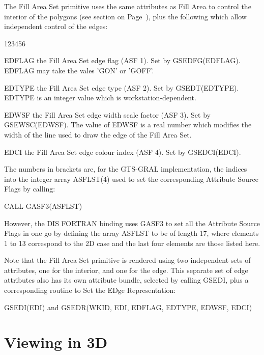 The Fill Area Set primitive uses the same attributes as Fill Area to
control the interior of the polygons (see section on Page~\pageref{sec:attlst}),
plus the following which allow independent control of the edges:
\begin{DLtt}{123456}
\item[EDFLAG]
the Fill Area Set edge flag (ASF 1). Set by GSEDFG(EDFLAG).
EDFLAG may take the vales 'GON' or 'GOFF'.
\item[EDTYPE]
the Fill Area Set edge type (ASF 2). Set by GSEDT(EDTYPE).
EDTYPE is an integer value which is workstation-dependent.
\item[EDWSF]
the Fill Area Set edge width scale factor (ASF 3). Set by GSEWSC(EDWSF).
The value of EDWSF is a real number which modifies the width of the line
used to draw the edge of the Fill Area Set.
\item[EDCI]
the Fill Area Set edge colour index (ASF 4). Set by GSEDCI(EDCI).
\end{DLtt}
The numbers in brackets are, for the GTS-GRAL implementation,
the indices into the integer array ASFLST(4)
used to set the corresponding Attribute Source Flags by calling:
\begin{XMP}
CALL GASF3(ASFLST)
\end{XMP}
However, the DIS FORTRAN binding uses GASF3 to set all the
Attribute Source Flags in one go by defining the array ASFLST to be of
length 17, where elements 1 to 13 correspond to the 2D case and the last
four elements are those listed here.
 
Note that the Fill Area Set
primitive is rendered using two independent sets of attributes,
one for the interior, and one for the edge. This separate set of
edge attributes also has its own attribute bundle, selected by calling
GSEDI, plus a corresponding routine to Set the EDge Representation:
\begin{XMP}
GSEDI(EDI)
     and
GSEDR(WKID, EDI, EDFLAG, EDTYPE, EDWSF, EDCI)
\end{XMP}
\section{Viewing in 3D}
 
